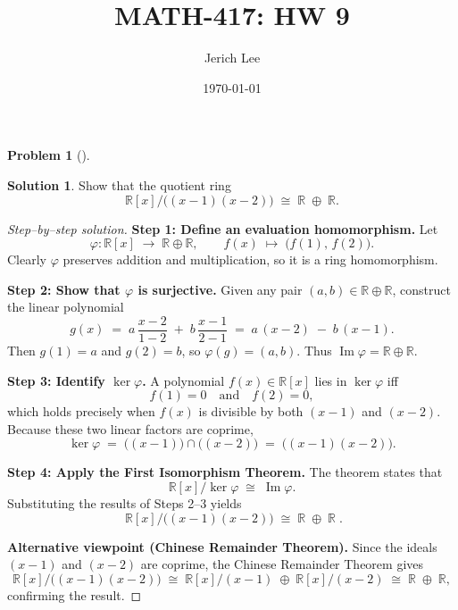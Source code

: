 \documentclass[12pt]{article}
\title{MATH-417: HW 9}
\author{Jerich Lee}
\date{\today}
\theoremstyle{definition} %
\newtheorem{solution}{Solution}
\newtheorem{problem}{Problem}
\theoremstyle{plain} %
\begin{document}
\maketitle
\begin{problem}[]
  
\end{problem}
\begin{solution}

    Show that the quotient ring
    \[
      \mathbb{R}[x]\big/\bigl((x-1)(x-2)\bigr)
      \;\cong\;
      \mathbb{R}\;\oplus\;\mathbb{R}.
    \]

    
    \begin{proof}[Step–by–step solution]
    \textbf{Step 1:  Define an evaluation homomorphism.}\newline
    Let
    \[
      \varphi:\mathbb{R}[x]\;\longrightarrow\;\mathbb{R}\oplus\mathbb{R},
      \qquad
      f(x)\;\longmapsto\;\bigl(f(1),\,f(2)\bigr).
    \]
    Clearly $\varphi$ preserves addition and multiplication, so it is a ring
    homomorphism.
    
    \bigskip
    \textbf{Step 2:  Show that $\varphi$ is surjective.}\newline
    Given any pair $(a,b)\in\mathbb{R}\oplus\mathbb{R}$, construct the linear
    polynomial
    \[
      g(x)\;=\;a\,\frac{x-2}{1-2}\;+\;b\,\frac{x-1}{2-1}
             \;=\;a\,(x-2)\;-\;b\,(x-1).
    \]
    Then $g(1)=a$ and $g(2)=b$, so $\varphi(g)=(a,b)$.  Thus $\operatorname{Im}\varphi
    =\mathbb{R}\oplus\mathbb{R}$.
    
    \bigskip
    \textbf{Step 3:  Identify $\ker\varphi$.}\newline
    A polynomial $f(x)\in\mathbb{R}[x]$ lies in $\ker\varphi$ iff
    \[
      f(1)=0\quad\text{and}\quad f(2)=0,
    \]
    which holds precisely when $f(x)$ is divisible by both $(x-1)$ and $(x-2)$.
    Because these two linear factors are coprime,
    \[
      \ker\varphi
      \;=\;\bigl((x-1)\bigr)\cap\bigl((x-2)\bigr)
      \;=\;\bigl((x-1)(x-2)\bigr).
    \]
    
    \bigskip
    \textbf{Step 4:  Apply the First Isomorphism Theorem.}\newline
    The theorem states that
    \[
      \mathbb{R}[x]/\ker\varphi
      \;\cong\;
      \operatorname{Im}\varphi.
    \]
    Substituting the results of Steps 2–3 yields
    \[
      \boxed{\;
        \mathbb{R}[x]\big/\bigl((x-1)(x-2)\bigr)
        \;\cong\;
        \mathbb{R}\;\oplus\;\mathbb{R}\;} .
    \]
    
    \bigskip
    \textbf{Alternative viewpoint (Chinese Remainder Theorem).}\newline
    Since the ideals $(x-1)$ and $(x-2)$ are coprime,
    the Chinese Remainder Theorem gives
    \[
      \mathbb{R}[x]\big/\bigl((x-1)(x-2)\bigr)
      \;\cong\;
      \mathbb{R}[x]/(x-1)\;\oplus\;\mathbb{R}[x]/(x-2)
      \;\cong\;
      \mathbb{R}\;\oplus\;\mathbb{R},
    \]
    confirming the result.
    \end{proof} 

\end{solution}
\end{document}
